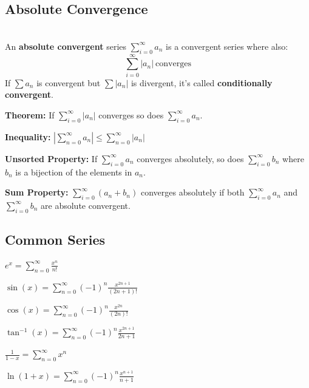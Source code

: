 \documentclass[8pt,a4paper]{extarticle}     %
\theoremstyle{definition}
\theoremstyle{definition}
\theoremstyle{definition}
\begin{document}
\begin{multicols}{4}
\subsection{Absolute Convergence}
\begin{boxdefinition} \ \\
	An \textbf{absolute convergent} series $\sum_{i=0}^\infty a_n$ is a convergent series where also: $$\sum_{i=0}^\infty |a_n|\ \text{converges}$$
	If $\sum a_n$ is convergent but $\sum |a_n|$ is divergent, it's called \textbf{conditionally convergent}.
\end{boxdefinition}
\begin{eqlist}
	\item \textbf{Theorem:} If $\sum_{i=0}^\infty |a_n|$ converges so does $\sum_{i=0}^\infty a_n$.
	\item \textbf{Inequality:} $\left|\sum_{n=0}^\infty a_n \right| \leq \sum_{n=0}^\infty |a_n|$
	\item \textbf{Unsorted Property:} If $\sum_{i=0}^\infty a_n$ converges absolutely, so does $\sum_{i=0}^\infty b_n$ where $b_n$ is a bijection of the elements in $a_n$.
	\item \textbf{Sum Property:} $\sum_{i=0}^\infty (a_n+b_n)$ converges absolutely if both $\sum_{i=0}^\infty a_n$ and $\sum_{i=0}^\infty b_n$ are absolute convergent.  
\end{eqlist}

\subsection{Common Series}
\begin{eqlist}
	\item $e^x = \sum_{n=0}^\infty\frac{x^{n}}{n!}$
	\item $\sin(x) = \sum_{n=0}^\infty(-1)^n\frac{x^{2n+1}}{(2n+1)!}$
	\item $\cos(x) = \sum_{n=0}^\infty(-1)^n\frac{x^{2n}}{(2n)!}$
	\item $\tan^{-1}(x) = \sum_{n=0}^\infty(-1)^n\frac{x^{2n+1}}{2n+1}$
	\item $\frac{1}{1-x}= \sum_{n=0}^\infty x^n$
	\item $\ln(1+x) = \sum_{n=0}^\infty (-1)^n\frac{x^{n+1}}{n+1}$
\end{eqlist}

\end{multicols}
\end{document}
